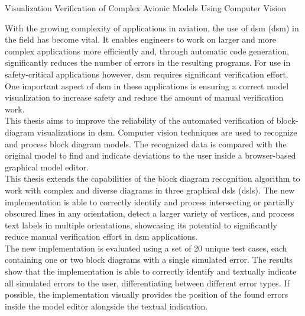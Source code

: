 \label{abstract}
{\LARGE Visualization Verification of Complex Avionic Models Using Computer Vision}

With the growing complexity of applications in aviation, the use of \acrlong{dsm} (\acrshort{dsm}) in the field has become vital. It enables engineers to work on larger and more complex applications more efficiently and, through automatic code generation, significantly reduces the number of errors in the resulting programs. For use in safety-critical applications however, \acrshort{dsm} requires significant verification effort. One important aspect of \acrshort{dsm} in these applications is ensuring a correct model visualization to increase safety and reduce the amount of manual verification work.\\
This thesis aims to improve the reliability of the automated verification of block-diagram visualizations in \acrshort{dsm}. Computer vision techniques are used to recognize and process block diagram models. The recognized data is compared with the original model to find and indicate deviations to the user inside a browser-based graphical model editor.\\
This thesis extends the capabilities of the block diagram recognition algorithm to work with complex and diverse diagrams in three graphical \acrlong{dsl}s (\acrshort{dsl}s). The new implementation is able to correctly identify and process intersecting or partially obscured lines in any orientation, detect a larger variety of vertices, and process text labels in multiple orientations, showcasing its potential to significantly reduce manual verification effort in \acrshort{dsm} applications.\\
The new implementation is evaluated using a set of 20 unique test cases, each containing one or two block diagrams with a single simulated error. The results show that the implementation is able to correctly identify and textually indicate all simulated errors to the user, differentiating between different error types. If possible, the implementation visually provides the position of the found errors inside the model editor alongside the textual indication.